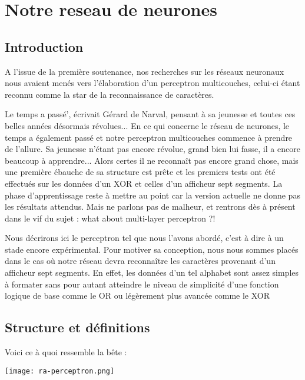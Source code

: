 


\chapter{Notre reseau de neurones} %
\label{cha:notre_reseau_de_neurones}

\section{Introduction} %
\label{subsec:introduction}
A l'issue de la premi\`ere soutenance, nos recherches sur les r\'eseaux
neuronaux nous avaient men\'es vers l'\'elaboration d'un perceptron
multicouches, celui-ci \'etant reconnu comme la star de la
reconnaissance de caract\`eres.

Le temps a pass\'e', \'ecrivait G\'erard de Narval, pensant \`a sa jeunesse
et toutes ces belles ann\'ees d\'esormais r\'evolues... En ce qui
concerne le r\'eseau de neurones, le temps a \'egalement pass\'e et
notre perceptron multicouches commence \`a prendre de l'allure. Sa
jeunesse n'\'etant pas encore r\'evolue, grand bien lui fasse, il a
encore beaucoup \`a apprendre... Alors
certes il ne reconna\^it pas encore grand chose, mais une premi\`ere
\'ebauche de sa structure est pr\^ete et les premiers tests ont \'et\'e
effectu\'es sur les donn\'ees d'un XOR et celles d'un afficheur sept
segments. La phase d'apprentissage reste \`a mettre au point car la
version actuelle ne donne pas les r\'esultats attendus. Mais ne parlons
pas de malheur, et rentrons d\`es \`a pr\'esent dans le vif du sujet : what about
multi-layer perceptron ?! 

Nous d\'ecrirons ici le perceptron tel que nous l'avons abord\'e, c'est \`a
dire \`a un stade encore exp\'erimental. Pour motiver sa conception,
nous nous sommes plac\'es dans le cas o\`u notre r\'eseau devra
reconna\^itre les caract\`eres provenant d'un afficheur sept
segments. En effet, les donn\'ees d'un tel alphabet sont assez simples
\`a formater sans pour autant atteindre le niveau de simplicit\'e d'une
fonction logique de base comme le OR ou l\'eg\`erement plus avanc\'ee
comme le XOR

\pagebreak
\section{Structure et d\'efinitions} %
\label{subsec:structure_et_definitions}

Voici ce \`a quoi ressemble la b\^ete :
\begin{center}
	
	\texttt{[image: ra-perceptron.png]}\\
	\caption{\emph{Perceptron \`a une couche cach\'ee}}\\
\end{center}

